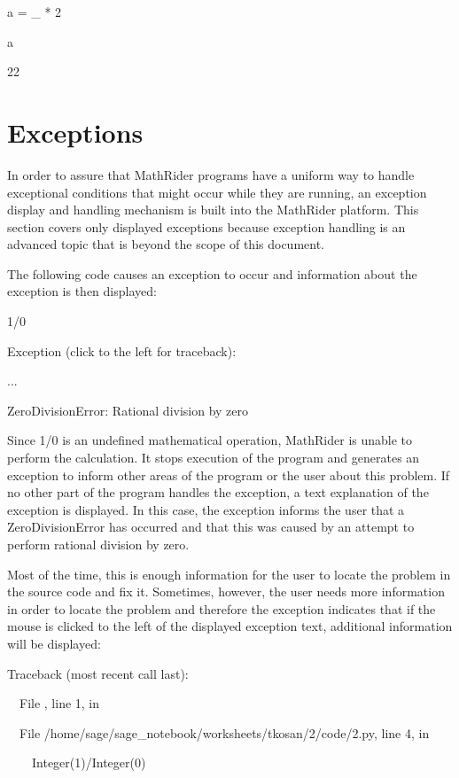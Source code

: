 \documentclass[12pt,oneside]{book}
\begin{document}
a = \_ * 2

a

{\textbar}

22

\section[Exceptions]{Exceptions}

In order to assure that MathRider programs have a uniform way to handle exceptional conditions that might occur while they are running, an exception display and handling mechanism is built into the MathRider platform. This section covers only displayed exceptions because exception handling is an advanced topic that is beyond the scope of this document. 

The following code causes an exception to occur and information about the exception is then displayed: 

1/0

{\textbar}

Exception (click to the left for traceback):

...

ZeroDivisionError: Rational division by zero


Since 1/0 is an undefined mathematical operation, MathRider is unable to perform the calculation. It stops execution of the program and generates an exception to inform other areas of the program or the user about this problem. If no other part of the program handles the exception, a text explanation of the exception is displayed. In this case, the exception informs the user that a ZeroDivisionError has occurred and that this was caused by an attempt to perform {\textquotedbl}rational division by zero{\textquotedbl}. 

Most of the time, this is enough information for the user to locate the problem in the source code and fix it. Sometimes, however, the user needs more information in order to locate the problem and therefore the exception indicates that if the mouse is clicked to the left of the displayed exception text, additional information will be displayed: 

Traceback (most recent call last):

\ \ File {\textquotedbl}{\textquotedbl}, line 1, in 

\ \ File
{\textquotedbl}/home/sage/sage\_notebook/worksheets/tkosan/2/code/2.py{\textquotedbl},  line 4, in 

\ \ \ \ Integer(1)/Integer(0)
\end{document}
